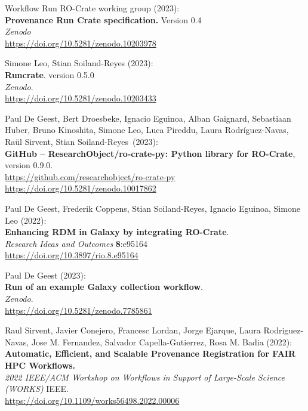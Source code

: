 \documentclass[10pt,letterpaper]{article}
\begin{document}
\begin{thebibliography}{10}
\begin{small}
 Workflow Run RO-Crate working group (2023):\\
\textbf{Provenance Run Crate specification.} Version 0.4\\
\emph{Zenodo} \\
\url{https://doi.org/10.5281/zenodo.10203978}

Simone Leo, Stian Soiland-Reyes (2023):\\
\textbf{Runcrate}. version 0.5.0\\
\emph{Zenodo}.\\
\url{https://doi.org/10.5281/zenodo.10203433}

Paul De Geest, Bert Droesbeke, Ignacio Eguinoa, Alban Gaignard, Sebastiaan Huber, Bruno Kinoshita, Simone Leo, Luca Pireddu, Laura Rodríguez-Navas, Raül Sirvent, Stian Soiland-Reyes~(2023):\\
\textbf{GitHub -- ResearchObject/ro-crate-py: Python library for
RO-Crate}, version 0.9.0.\\
\url{https://github.com/researchobject/ro-crate-py}\\
\url{https://doi.org/10.5281/zenodo.10017862}

 Paul De Geest, Frederik Coppens, Stian Soiland-Reyes, Ignacio Eguinoa, Simone Leo (2022):\\
\textbf{Enhancing RDM in Galaxy by integrating RO-Crate}.\\
\emph{Research Ideas and Outcomes} \textbf{8}:e95164\\
\url{https://doi.org/10.3897/rio.8.e95164}


Paul De Geest (2023):\\
\textbf{Run of an example Galaxy collection workflow}.\\
\emph{Zenodo}.\\
\url{https://doi.org/10.5281/zenodo.7785861}


Raul Sirvent, Javier Conejero, Francesc Lordan, Jorge Ejarque, Laura Rodriguez-Navas, Jose M. Fernandez, Salvador Capella-Gutierrez, Rosa M. Badia (2022):\\
\textbf{Automatic, Efficient, and Scalable Provenance Registration for
FAIR HPC Workflows.}\\
\emph{2022 IEEE/ACM Workshop on Workflows in Support of Large-Scale Science (WORKS)} IEEE.\\
\url{https://doi.org/10.1109/works56498.2022.00006}\\


\end{small}
\end{thebibliography}
\end{document}
